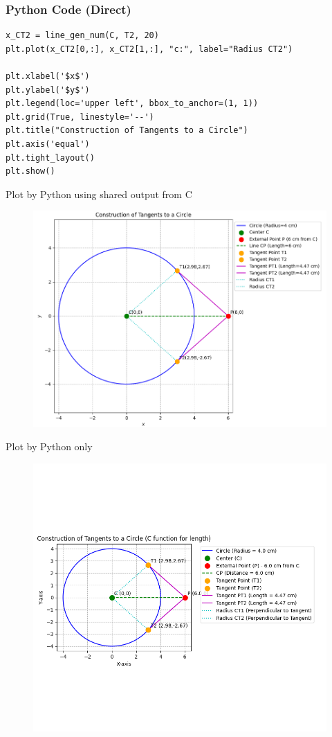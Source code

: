 \documentclass{beamer}
\begin{document}
\begin{frame}[fragile]
\frametitle{Python Code (Direct)}
\begin{lstlisting}
x_CT2 = line_gen_num(C, T2, 20)
plt.plot(x_CT2[0,:], x_CT2[1,:], "c:", label="Radius CT2")

plt.xlabel('$x$')
plt.ylabel('$y$')
plt.legend(loc='upper left', bbox_to_anchor=(1, 1))
plt.grid(True, linestyle='--')
plt.title("Construction of Tangents to a Circle")
plt.axis('equal')
plt.tight_layout()
plt.show()
\end{lstlisting}
\end{frame}

\begin{frame}{Plot by Python using shared output from C}
\begin{figure}[H]
\centering
\includegraphics[width=0.8\columnwidth]{../figs/fig1.png}
\caption{}
\label{fig:1}
\end{figure}
\end{frame}

\begin{frame}{Plot by Python only}
\begin{figure}[H]
\centering
\includegraphics[width=0.7\columnwidth]{../figs/fig2.png}
\caption{}
\label{fig:2}
\end{figure}
\end{frame}
\end{document}
